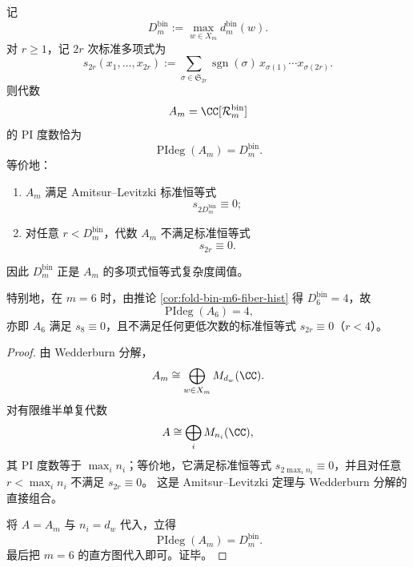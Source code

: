 \begin{theorem}\label{thm:conclusion-foldbin-groupoid-pi-degree-threshold}
记
\[
D_m^{\mathrm{bin}}:=\max_{w\in X_m}d_m^{\mathrm{bin}}(w).
\]
对 \(r\ge 1\)，记 \(2r\) 次标准多项式为
\[
s_{2r}(x_1,\dots,x_{2r})
:=
\sum_{\sigma\in \mathfrak S_{2r}}\operatorname{sgn}(\sigma)\,
x_{\sigma(1)}\cdots x_{\sigma(2r)}.
\]
则代数
\[
A_m=\CC[\mathcal R_m^{\mathrm{bin}}]
\]
的 PI 度数恰为
\[
\operatorname{PIdeg}(A_m)=D_m^{\mathrm{bin}}.
\]
等价地：
\begin{enumerate}
  \item \(A_m\) 满足 Amitsur--Levitzki 标准恒等式
  \[
  s_{2D_m^{\mathrm{bin}}}\equiv 0;
  \]
  \item 对任意 \(r<D_m^{\mathrm{bin}}\)，代数 \(A_m\) 不满足标准恒等式
  \[
  s_{2r}\equiv 0.
  \]
\end{enumerate}
因此 \(D_m^{\mathrm{bin}}\) 正是 \(A_m\) 的多项式恒等式复杂度阈值。

特别地，在 \(m=6\) 时，由推论 \ref{cor:fold-bin-m6-fiber-hist} 得 \(D_6^{\mathrm{bin}}=4\)，故
\[
\operatorname{PIdeg}(A_6)=4,
\]
亦即 \(A_6\) 满足 \(s_8\equiv 0\)，且不满足任何更低次数的标准恒等式 \(s_{2r}\equiv 0\)（\(r<4\)）。
\end{theorem}
\begin{proof}
由 Wedderburn 分解，
\[
A_m\cong \bigoplus_{w\in X_m}M_{d_w}(\CC).
\]
对有限维半单复代数
\[
A\cong \bigoplus_i M_{n_i}(\CC),
\]
其 PI 度数等于 \(\max_i n_i\)；等价地，它满足标准恒等式 \(s_{2\max_i n_i}\equiv 0\)，并且对任意 \(r<\max_i n_i\) 不满足 \(s_{2r}\equiv 0\)。
这是 Amitsur--Levitzki 定理与 Wedderburn 分解的直接组合。

将 \(A=A_m\) 与 \(n_i=d_w\) 代入，立得
\[
\operatorname{PIdeg}(A_m)=D_m^{\mathrm{bin}}.
\]
最后把 \(m=6\) 的直方图代入即可。证毕。
\end{proof}
